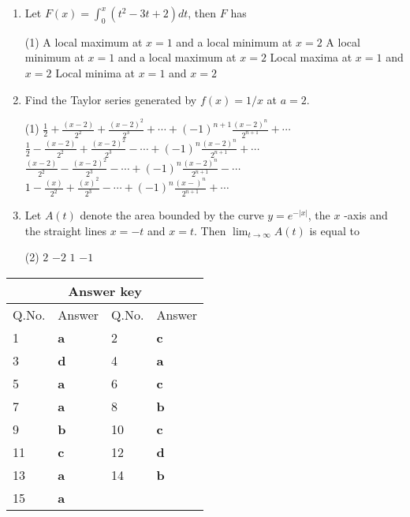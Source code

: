 \begin{enumerate}
	
	
	\item  Let $F(x)=\int_{0}^{x}\left(t^{2}-3 t+2\right) d t$, then $F$ has
	\begin{tasks}(1)
		\task[\textbf{a.}] A local maximum at $x=1$ and a local minimum at $x=2$ 
		\task[\textbf{b.}]A local minimum at $x=1$ and a local maximum at $x=2$
		\task[\textbf{c.}] Local maxima at $x=1$ and $x=2$
		\task[\textbf{d.}] Local minima at $x=1$ and $x=2$
	\end{tasks}
	\item Find the Taylor series generated by $f(x)=1 / x$ at $a=2$.
	\begin{tasks}(1)
		\task[\textbf{a.}]$\frac{1}{2}+\frac{(x-2)}{2^{2}}+\frac{(x-2)^{2}}{2^{3}}+\cdots+(-1)^{n+1} \frac{(x-2)^{n}}{2^{n+1}}+\cdots$  
		\task[\textbf{b.}]$\frac{1}{2}-\frac{(x-2)}{2^{2}}+\frac{(x-2)^{2}}{2^{3}}-\cdots+(-1)^{n} \frac{(x-2)^{n}}{2^{n+1}}+\cdots$
		\task[\textbf{c.}] $\frac{(x-2)}{2^{2}}-\frac{(x-2)^{2}}{2^{3}}-\cdots+(-1)^{n} \frac{(x-2)^{n}}{2^{n+1}}-\cdots$
		\task[\textbf{d.}] $1-\frac{(x)}{2^{2}}+\frac{(x)^{2}}{2^{3}}-\cdots+(-1)^{n} \frac{(x-)^{n}}{2^{n+1}}+\cdots$
	\end{tasks}
	\item Let $A(t)$ denote the area bounded by the curve $y=e^{-|x|}$, the $x$ -axis and the straight lines $x=-t$
	and $x=t$. Then $\lim _{t \rightarrow \infty} A(t)$ is equal to
	\begin{tasks}(2)
		\task[\textbf{a.}]$2$  
		\task[\textbf{b.}]$-2$
		\task[\textbf{c.}]$1$ 
		\task[\textbf{d.}]$-1$ 
	\end{tasks}
\end{enumerate}
\setlength\arrayrulewidth{1pt}
\begin{table}[H]
	\centering
	
	\begin{tabular}{|p{1.5cm}|p{1.5cm}||p{1.5cm}|p{1.5cm}|}
		\hline
		\multicolumn{4}{|c|}{\textbf{Answer key}}\\\hline\hline
		\rowcolor{ocrel}Q.No.&Answer&Q.No.&Answer\\\hline
		1&\textbf{a}&2&\textbf{c}\\\hline 
		3&\textbf{d}&4&\textbf{a}\\\hline
		5&\textbf{a}&6&\textbf{c}\\\hline
		7&\textbf{a}&8&\textbf{b}\\\hline
		9&\textbf{b}&10&\textbf{c}\\\hline
		11&\textbf{c}&12&\textbf{d}\\\hline
		13&\textbf{a}&14&\textbf{b}\\\hline
		15&\textbf{a}&&\\\hline
	\end{tabular}
\end{table}
